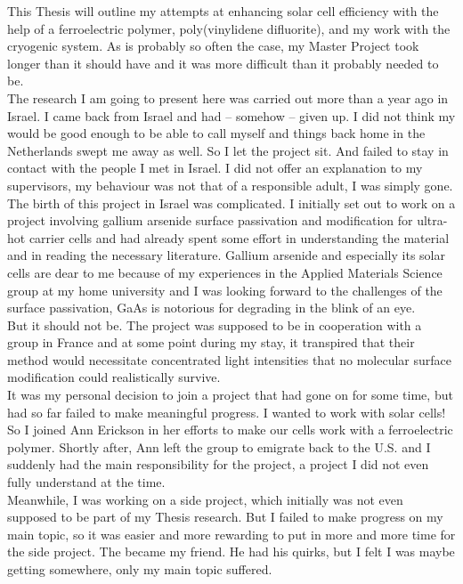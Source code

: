 \begin{personalintro}
\addchaptertocentry{\introname}
This Thesis will outline my attempts at enhancing solar cell efficiency with the help of a ferroelectric polymer, poly(vinylidene difluorite), and my work with the \McA{} cryogenic system. As is probably so often the case, my Master Project took longer than it should have and it was more difficult than it probably needed to be.\\
The research I am going to present here was carried out more than a year ago in Israel. I came back from Israel and had -- somehow -- given up. I did not think my  would be good enough to be able to call myself \degreename{} and things back home in the Netherlands swept me away as well. So I let the project sit. And failed to stay in contact with the people I met in Israel. I did not offer an explanation to my supervisors, my behaviour was not that of a responsible adult, I was simply gone.\\
The birth of this project in Israel was complicated. I initially set out to work on a project involving gallium arsenide surface passivation and modification for ultra-hot carrier cells and had already spent some effort in understanding the material and in reading the necessary literature. Gallium arsenide and especially its solar cells are dear to me because of my experiences in the Applied Materials Science group at my home university and I was looking forward to the challenges of the surface passivation, GaAs is notorious for degrading in the blink of an eye.\\
But it should not be. The project was supposed to be in cooperation with a group in France and at some point during my stay, it transpired that their method would necessitate concentrated light intensities that no molecular surface modification could realistically survive.\\
It was my personal decision to join a project that had gone on for some time, but had so far failed to make meaningful progress. I wanted to work with solar cells! So I joined Ann Erickson in her efforts to make our cells work with a ferroelectric polymer. Shortly after, Ann left the group to emigrate back to the U.S. and I suddenly had the main responsibility for the project, a project I did not even fully understand at the time.\\
Meanwhile, I was working on a side project, which initially was not even supposed to be part of my Thesis research. But I failed to make progress on my main topic, so it was easier and more rewarding to put in more and more time for the side project. The \McA{} became my friend. He had his quirks, but I felt I was maybe getting somewhere, only my main topic suffered.\\

\end{personalintro}
